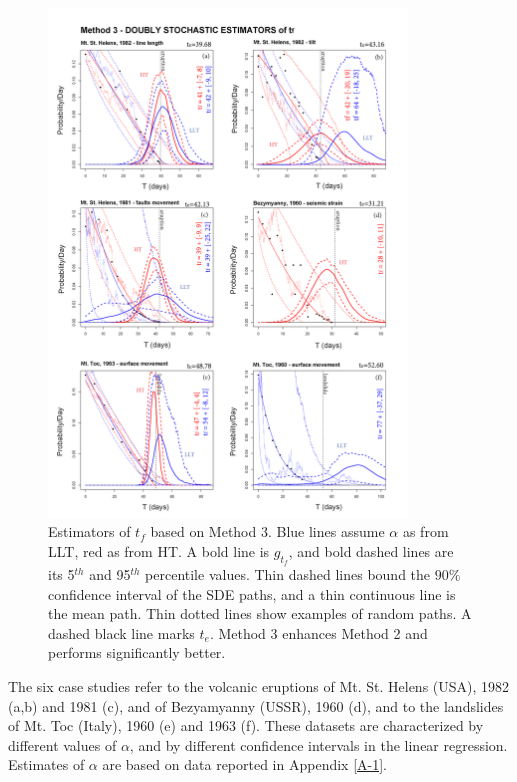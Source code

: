 \documentclass{article}
\begin{document}
\begin{figure}[H]\vskip-0.5cm
\centering
\includegraphics[width=0.85\textwidth]{Fig7_plus.png}
\caption{Estimators of $t_f$ based on Method 3. Blue lines assume $\alpha$ as from LLT, red as from HT. A bold line is $g_{t_f}$, and bold dashed lines are its 5$^{th}$ and 95$^{th}$ percentile values. Thin dashed lines bound the $90\%$ confidence interval of the SDE paths, and a thin continuous line is the mean path. Thin dotted lines show examples of random paths. A dashed black line marks $t_e$. Method 3 enhances Method 2 and performs significantly better.}
\label{Fig7}
\end{figure}

The six case studies refer to the volcanic eruptions of Mt. St. Helens (USA), 1982 (a,b) and 1981 (c), and of Bezyamyanny (USSR), 1960 (d), and to the landslides of Mt. Toc (Italy), 1960 (e) and 1963 (f). These datasets are characterized by different values of $\alpha$, and by different confidence intervals in the linear regression. Estimates of $\alpha$ are based on data reported in Appendix \ref{A-1}.
\end{document}
